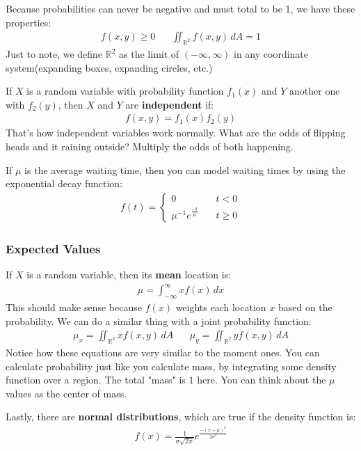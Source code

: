 \documentclass{article}
\begin{document}
Because probabilities can never be negative and must total to be 1, we have these properties:
\begin{gather*}
    f(x,y) \geqslant 0 \hspace{20pt} \iint_{\mathbb{R}^2} f(x,y) \, dA = 1
\end{gather*}
Just to note, we define $\mathbb{R}^2$ as the limit of $(-\infty, \infty)$ in any coordinate system(expanding boxes, expanding circles, etc.)

If $X$ is a random variable with probability function $f_1(x)$ and $Y$ another one with $f_2(y)$, then $X$ and $Y$ are \textbf{independent} if:
\begin{gather*}
    f(x,y) = f_1(x) f_2(y)
\end{gather*}
That's how independent variables work normally. What are the odds of flipping heads and it raining outside? Multiply the odds of both happening.

If $\mu$ is the average waiting time, then you can model waiting times by using the exponential decay function:
\begin{gather*}
    f(t) = \left\{
        \begin{array}{ll}
            0 & \quad t < 0 \\
            \mu^{-1}e^{\frac{-t}{\mu}} & \quad t \geq 0
        \end{array}
    \right.
\end{gather*}
\subsubsection{Expected Values}
If $X$ is a random variable, then its \textbf{mean} location is:
\begin{gather*}
    \mu = \int_{-\infty}^\infty xf(x) \, dx
\end{gather*}
This should make sense because $f(x)$ weights each location $x$ based on the probability. We can do a similar thing with a joint probability function:
\begin{gather*}
    \mu_x = \iint_{\mathbb{R}^2} xf(x,y) \, dA \hspace{20pt} \mu_y = \iint_{\mathbb{R}^2} yf(x,y) \, dA
\end{gather*}
Notice how these equations are very similar to the moment ones. You can calculate probability just like you calculate mass, by integrating some density function over a region. The total "mass" is $1$ here. You can think about the $\mu$ values as the center of mass.

Lastly, there are \textbf{normal distributions}, which are true if the density function is:
\begin{gather*}
    f(x) = \frac{1}{\sigma \sqrt{2\pi}}e^\frac{-(x-\mu)^2}{2\sigma^2}
\end{gather*}
\end{document}
